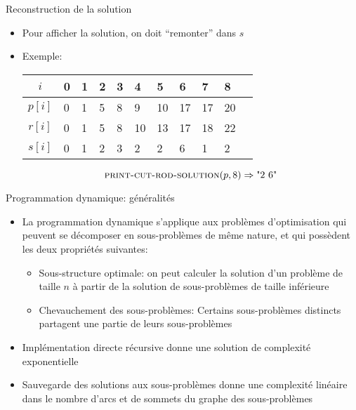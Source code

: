 \begin{frame}{Reconstruction de la solution}
\begin{itemize}
\item Pour afficher la solution, on doit ``remonter'' dans $s$
\bigskip

\begin{center}
{\footnotesize
{}
}
\end{center}

\bigskip

\item Exemple:
\bigskip
\begin{center}\small
\begin{tabular}{c|llllllllll}
$i$ & 0 & 1 & 2 & 3 & 4 & 5 & 6 & 7 & 8 \\
\hline
$p[i]$ & 0 & 1 & 5 & 8 & 9 & 10 & 17 & 17 & 20 \\
$r[i]$ & 0 &  1 & 5 & 8 & 10 & 13 & 17 & 18 & 22\\
$s[i]$ & 0 & 1 & 2 & 3 & 2 & 2 & 6 & 1 & 2\\
\end{tabular}
\end{center}
\bigskip
$$\textnormal{\scshape print-cut-rod-solution}(p,8) \Rightarrow \mbox{"2 6"}$$

\end{itemize}
\end{frame}

\begin{frame}{Programmation dynamique: généralités}
\begin{itemize}
\item La programmation dynamique s'applique aux problèmes d'\alert{optimisation} qui peuvent se décomposer en sous-problèmes de même nature, et qui possèdent les deux propriétés suivantes:
\begin{itemize}
\item \alert{Sous-structure optimale:} on peut calculer la solution d'un problème de taille $n$ à partir de la solution de sous-problèmes de taille inférieure
\item \alert{Chevauchement des sous-problèmes:} Certains sous-problèmes distincts partagent une partie de leurs sous-problèmes
\end{itemize}
\item Implémentation directe récursive donne une solution de complexité exponentielle
\item Sauvegarde des solutions aux sous-problèmes donne une complexité linéaire dans le nombre d'arcs et de sommets du graphe des sous-problèmes
\end{itemize}
\end{frame}

